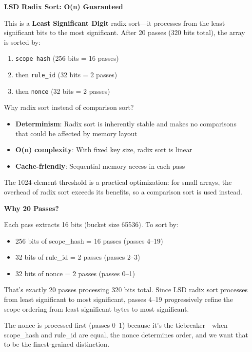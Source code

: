 \documentclass[11pt]{book}
\begin{document}
\begin{cleverpattern}
\textbf{LSD Radix Sort: O(n) Guaranteed}

This is a \textbf{Least Significant Digit} radix sort---it processes from the least significant bits to the most significant. After 20 passes (320 bits total), the array is sorted by:
\begin{enumerate}
\item \texttt{scope\_hash} (256 bits = 16 passes)
\item then \texttt{rule\_id} (32 bits = 2 passes)
\item then \texttt{nonce} (32 bits = 2 passes)
\end{enumerate}

Why radix sort instead of comparison sort?
\begin{itemize}
\item \textbf{Determinism}: Radix sort is inherently stable and makes no comparisons that could be affected by memory layout
\item \textbf{O(n) complexity}: With fixed key size, radix sort is linear
\item \textbf{Cache-friendly}: Sequential memory access in each pass
\end{itemize}

The 1024-element threshold is a practical optimization: for small arrays, the overhead of radix sort exceeds its benefits, so a comparison sort is used instead.
\end{cleverpattern}

\begin{deepdive}
\textbf{Why 20 Passes?}

Each pass extracts 16 bits (bucket size 65536). To sort by:
\begin{itemize}
\item 256 bits of scope\_hash = 16 passes (passes 4--19)
\item 32 bits of rule\_id = 2 passes (passes 2--3)
\item 32 bits of nonce = 2 passes (passes 0--1)
\end{itemize}

That's exactly 20 passes processing 320 bits total. Since LSD radix sort processes from least significant to most significant, passes 4--19 progressively refine the scope ordering from least significant bytes to most significant.

The nonce is processed first (passes 0--1) because it's the tiebreaker---when scope\_hash and rule\_id are equal, the nonce determines order, and we want that to be the finest-grained distinction.
\end{deepdive}
\end{document}
